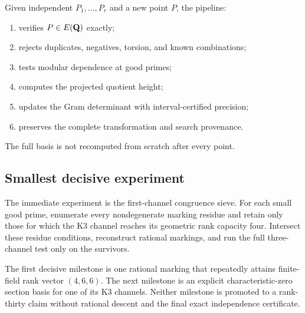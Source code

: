 Given independent $P_1,\ldots,P_r$ and a new point $P$, the pipeline:
\begin{enumerate}[leftmargin=*]
\item verifies $P\in E(\mathbf Q)$ exactly;
\item rejects duplicates, negatives, torsion, and known combinations;
\item tests modular dependence at good primes;
\item computes the projected quotient height;
\item updates the Gram determinant with interval-certified precision;
\item preserves the complete transformation and search provenance.
\end{enumerate}
The full basis is not recomputed from scratch after every point.

\subsection{Smallest decisive experiment}

The immediate experiment is the first-channel congruence sieve.  For each
small good prime, enumerate every nondegenerate marking residue and retain only
those for which the K3 channel reaches its geometric rank capacity four.
Intersect these residue conditions, reconstruct rational markings, and run the
full three-channel test only on the survivors.

The first decisive milestone is one rational marking that repeatedly attains
finite-field rank vector $(4,6,6)$.  The next milestone is an explicit
characteristic-zero section basis for one of its K3 channels.  Neither
milestone is promoted to a rank-thirty claim without rational descent and the
final exact independence certificate.
